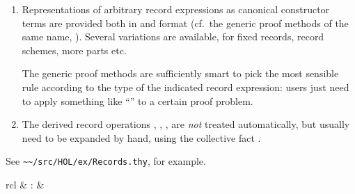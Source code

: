 \begin{isabellebody}
\begin{isamarkuptext}
\begin{enumerate}
  \item Representations of arbitrary record expressions as canonical
  constructor terms are provided both in \hyperlink{method.cases}{\mbox{}} and \hyperlink{method.induct}{\mbox{}} format (cf.\ the generic proof methods of the same name,
  ).  Several variations are available, for
  fixed records, record schemes, more parts etc.

  The generic proof methods are sufficiently smart to pick the most
  sensible rule according to the type of the indicated record
  expression: users just need to apply something like ``'' to a certain proof problem.

  \item The derived record operations , , ,  are \emph{not}
  treated automatically, but usually need to be expanded by hand,
  using the collective fact .

  \end{enumerate}%
\end{isamarkuptext}%
\isamarkuptrue%
%
\isamarkuptrue%
%
\begin{isamarkuptext}%
See \verb|~~/src/HOL/ex/Records.thy|, for example.%
\end{isamarkuptext}%
\isamarkuptrue%
%
\isamarkuptrue%
%
\begin{isamarkuptext}%
\begin{matharray}{rcl}
    \hypertarget{attribute.HOL.split-format}{\hyperlink{attribute.HOL.split-format}{\mbox{}}} & : &  \\
  \end{matharray}


\end{isamarkuptext}
\end{isabellebody}
